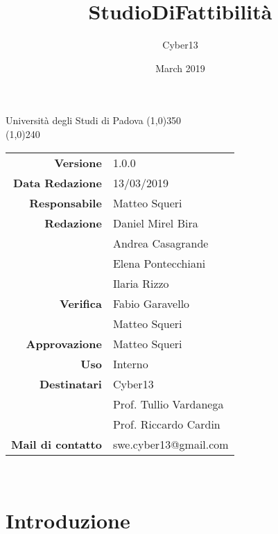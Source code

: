 \documentclass[a4paper, 12pt]{article}
\title{StudioDiFattibilità}
\author{Cyber13}
\date{March 2019}
\begin{document}
	\begin{titlepage}
		\centering Università degli Studi di Padova
		\line(1,0){350}\\
		\vspace{1.2cm}
		\logo
		\vspace{1.0cm}
		\vspace{0.5cm}
		\vspace{0.5cm}
		\line(1,0){240}\\
		\begin{tabular}{r|l}
			{\textbf{Versione}} 			& 1.0.0\\
			{\textbf{Data Redazione}} 	& 13/03/2019\\	%
			{\textbf{Responsabile}} 	& Matteo Squeri\\	%
			{\textbf{Redazione}} 		& Daniel Mirel Bira\\ & Andrea Casagrande\\ & Elena Pontecchiani\\ & Ilaria Rizzo\\
			{\textbf{Verifica}}  & Fabio Garavello\\ & Matteo Squeri\\ 
			{\textbf{Approvazione}} 		& Matteo Squeri\\
			{\textbf{Uso}} 				& Interno\\
			{\textbf{Destinatari}} 	& Cyber13\\ & Prof. Tullio Vardanega\\ & Prof. Riccardo Cardin\\
			{\textbf{Mail di contatto}} 	& swe.cyber13@gmail.com \\
		\end{tabular}\\
	\end{titlepage}

	\newpage
	    
    \newpage
		\tableofcontents
		\newpage
            \section{Introduzione}
                
                \newpage
\end{document}
